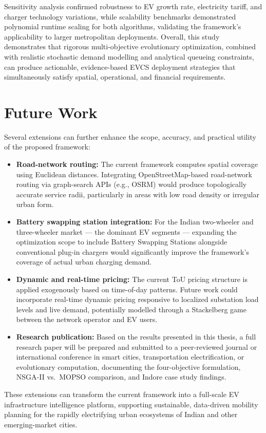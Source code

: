 Sensitivity analysis confirmed robustness to EV growth rate, electricity
tariff, and charger technology variations, while scalability benchmarks
demonstrated polynomial runtime scaling for both algorithms, validating
the framework's applicability to larger metropolitan deployments.
Overall, this study demonstrates that rigorous multi-objective evolutionary
optimization, combined with realistic stochastic demand modelling and
analytical queueing constraints, can produce actionable, evidence-based
EVCS deployment strategies that simultaneously satisfy spatial, operational,
and financial requirements.

\section{Future Work}

Several extensions can further enhance the scope, accuracy, and practical
utility of the proposed framework:

\begin{itemize}
    \item \textbf{Road-network routing:} The current framework computes
          spatial coverage using Euclidean distances. Integrating
          OpenStreetMap-based road-network routing via graph-search
          APIs (e.g., OSRM) would produce topologically accurate
          service radii, particularly in areas with low road density
          or irregular urban form.

    \item \textbf{Battery swapping station integration:} For the Indian
          two-wheeler and three-wheeler market --- the dominant EV
          segments --- expanding the optimization scope to include
          Battery Swapping Stations alongside conventional plug-in
          chargers would significantly improve the framework's
          coverage of actual urban charging demand.
    \item \textbf{Dynamic and real-time pricing:} The current ToU pricing
          structure is applied exogenously based on time-of-day patterns.
          Future work could incorporate real-time dynamic pricing
          responsive to localized substation load levels and live
          demand, potentially modelled through a Stackelberg game
          between the network operator and EV users.

    \item \textbf{Research publication:} Based on the results presented
          in this thesis, a full research paper will be prepared and
          submitted to a peer-reviewed journal or international
          conference in smart cities, transportation electrification,
          or evolutionary computation, documenting the four-objective
          formulation, NSGA-II vs.\ MOPSO comparison, and Indore
          case study findings.
\end{itemize}

\noindent
These extensions can transform the current framework into a full-scale
EV infrastructure intelligence platform, supporting sustainable,
data-driven mobility planning for the rapidly electrifying urban
ecosystems of Indian and other emerging-market cities.